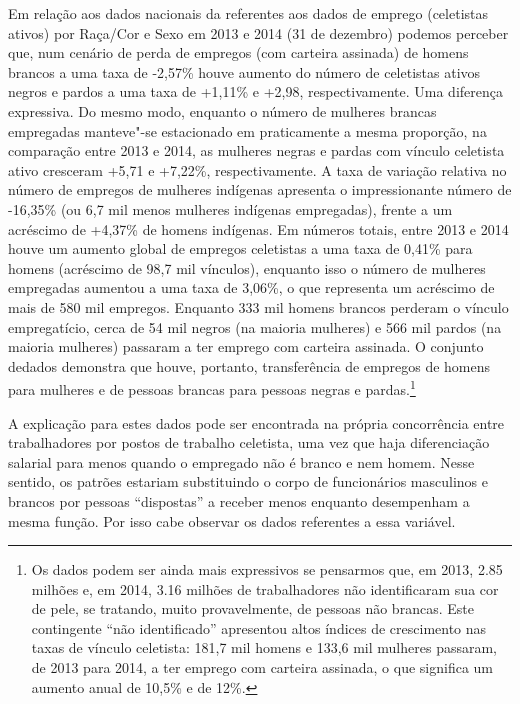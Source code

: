 Em relação aos dados nacionais da  referentes aos dados de emprego
(celetistas ativos) por Raça/Cor e Sexo em 2013 e 2014 (31 de dezembro)
podemos perceber que, num cenário de perda de empregos (com carteira
assinada) de homens brancos a uma taxa de -2,57\% houve aumento do
número de celetistas ativos negros e pardos a uma taxa de +1,11\% e
+2,98, respectivamente. Uma diferença expressiva. Do mesmo modo,
enquanto o número de mulheres brancas empregadas manteve"-se estacionado
em praticamente a mesma proporção, na comparação entre 2013 e 2014, as
mulheres negras e pardas com vínculo celetista ativo cresceram +5,71 e
+7,22\%, respectivamente. A taxa de variação relativa no número de
empregos de mulheres indígenas apresenta o impressionante número de
-16,35\% (ou 6,7 mil menos mulheres indígenas empregadas), frente a um
acréscimo de +4,37\% de homens indígenas. Em números totais, entre 2013
e 2014 houve um aumento global de empregos celetistas a uma taxa de
0,41\% para homens (acréscimo de 98,7 mil vínculos), enquanto isso o
número de mulheres empregadas aumentou a uma taxa de 3,06\%, o que
representa um acréscimo de mais de 580 mil empregos. Enquanto 333 mil
homens brancos perderam o vínculo empregatício, cerca de 54 mil negros
(na maioria mulheres) e 566 mil pardos (na maioria mulheres) passaram a
ter emprego com carteira assinada. O conjunto dedados demonstra que
houve, portanto, transferência de empregos de homens para mulheres e de
pessoas brancas para pessoas negras e pardas.\footnote{Os dados podem
  ser ainda mais expressivos se pensarmos que, em 2013, 2.85 milhões e,
  em 2014, 3.16 milhões de trabalhadores não identificaram sua cor de
  pele, se tratando, muito provavelmente, de pessoas não brancas. Este
  contingente ``não identificado'' apresentou altos índices de
  crescimento nas taxas de vínculo celetista: 181,7 mil homens e 133,6
  mil mulheres passaram, de 2013 para 2014, a ter emprego com carteira
  assinada, o que significa um aumento anual de 10,5\% e de 12\%.}

A explicação para estes dados pode ser encontrada na própria
concorrência entre trabalhadores por postos de trabalho celetista, uma
vez que haja diferenciação salarial para menos quando o empregado não é
branco e nem homem. Nesse sentido, os patrões estariam substituindo o
corpo de funcionários masculinos e brancos por pessoas ``dispostas'' a
receber menos enquanto desempenham a mesma função. Por isso cabe
observar os dados referentes a essa variável.

